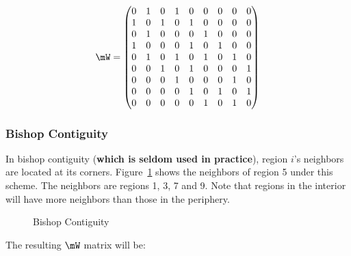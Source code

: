 \documentclass[english,12pt]{book}\usepackage[]{graphicx}\usepackage[]{xcolor}
\begin{document}
\begin{equation}
  \mW = 
  \begin{pmatrix}
     0 & 1 & 0 & 1 & 0 & 0 & 0 & 0 & 0 \\
     1 & 0 & 1 & 0 & 1 & 0 & 0 & 0 & 0 \\
     0 & 1 & 0 & 0 & 0 & 1 & 0 & 0 & 0 \\
     1 & 0 & 0 & 0 & 1 & 0 & 1 & 0 & 0 \\
     0 & 1 & 0 & 1 & 0 & 1 & 0 & 1 & 0 \\
     0 & 0 & 1 & 0 & 1 & 0 & 0 & 0 & 1 \\
     0 & 0 & 0 & 1 & 0 & 0 & 0 & 1 & 0 \\
     0 & 0 & 0 & 0 & 1 & 0 & 1 & 0 & 1 \\
     0 & 0 & 0 & 0 & 0 & 1 & 0 & 1 & 0 \\
  \end{pmatrix}
\end{equation}

\subsubsection{Bishop Contiguity}

In bishop contiguity (\textbf{which is seldom used in practice}), region $i$'s neighbors are located at its corners. Figure~\ref{fig:Bishop_cont_grid} shows the neighbors of region 5 under this scheme. The neighbors are regions 1, 3, 7 and 9. Note that regions in the interior will have more neighbors than those in the periphery. 


\begin{figure}[h]
\caption{Bishop Contiguity}
\label{fig:Bishop_cont_grid}
\centering
{}
\end{figure}

The resulting $\mW$ matrix will be:
\end{document}
